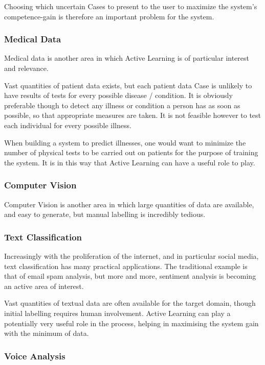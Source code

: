 \documentclass[a4paper,11pt]{report}
\begin{document}
Choosing which uncertain Cases to present to the user to maximize the system's competence-gain is therefore an important problem for the system.

\subsubsection{Medical Data}
Medical data is another area in which Active Learning is of particular interest and relevance.

Vast quantities of patient data exists, but each patient data Case is unlikely to have results of tests for every possible disease / condition. It is obviously preferable though to detect any illness or condition a person has as soon as possible, so that appropriate measures are taken. It is not feasible however to test each individual for every possible illness.

When building a system to predict illnesses, one would want to minimize the number of physical tests to be carried out on patients for the purpose of training the system. It is in this way that Active Learning can have a useful role to play.

\subsubsection{Computer Vision}
Computer Vision is another area in which large quantities of data are available, and easy to generate, but manual labelling is incredibly tedious.

\subsubsection{Text Classification}
Increasingly with the proliferation of the internet, and in particular social media, text classification has many practical applications. The traditional example is that of email spam analysis, but more and more, sentiment analysis is becoming an active area of interest.

Vast quantities of textual data are often available for the target domain, though initial labelling requires human involvement. Active Learning can play a potentially very useful role in the process, helping in maximising the system gain with the minimum of data.

\subsubsection{Voice Analysis}
\end{document}
